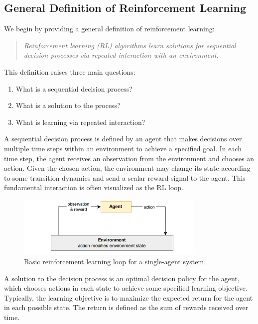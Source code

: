 \subsection*{General Definition of Reinforcement Learning}
We begin by providing a general definition of reinforcement learning:
\begin{quote}
    \textit{Reinforcement learning (RL) algorithms learn solutions for sequential decision processes via repeated interaction with an environment.} 
\end{quote}
This definition raises three main questions:
\begin{enumerate}
    \item What is a sequential decision process?
    \item What is a solution to the process?
    \item What is learning via repeated interaction?
\end{enumerate}

A sequential decision process is defined by an agent that makes decisions over multiple time steps within an environment to achieve a specified goal. In each time step, the agent receives an observation from the environment and chooses an action. Given the chosen action, the environment may change its state according to some transition dynamics and send a scalar reward signal to the agent. This fundamental interaction is often visualized as the RL loop.
\begin{figure}[h!]
\centering

 \includegraphics[width=0.8\textwidth]{img_pfe/rl_loop.PNG}
\caption{Basic reinforcement learning loop for a single-agent system.}
\label{fig:rl_loop}
\end{figure}



A solution to the decision process is an optimal decision policy for the agent, which chooses actions in each state to achieve some specified learning objective. Typically, the learning objective is to maximize the expected return for the agent in each possible state. The return is defined as the sum of rewards received over time.

